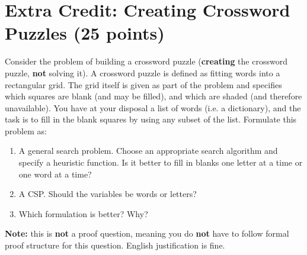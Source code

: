 \documentclass[11pt]{article}
\newcommand{\question}[1]{\section*{\normalsize #1}}
\begin{document}
\question{Extra Credit: Creating Crossword Puzzles (25 points)}
Consider the problem of building a crossword puzzle (\textbf{creating} the crossword puzzle, \textbf{not} solving it). A crossword puzzle is defined as fitting words into a rectangular grid. The grid itself is given as part of the problem and specifies which squares are blank (and may be filled), and which are shaded (and therefore unavailable). You have at your disposal a list of words (i.e. a dictionary), and the task is to fill in the blank squares by using any subset of the list. Formulate this problem as:

\begin{enumerate}[label=\alph*]
    \item A general search problem. Choose an appropriate search algorithm and specify a heuristic function. Is it better to fill in blanks one letter at a time or one word at a time?
    \item A CSP. Should the variables be words or letters?
    \item Which formulation is better? Why?
\end{enumerate}

\noindent\textbf{Note:} this is \textbf{not} a proof question, meaning you do \textbf{not} have to follow formal proof structure for this question. English justification is fine.
\newpage
\end{document}
